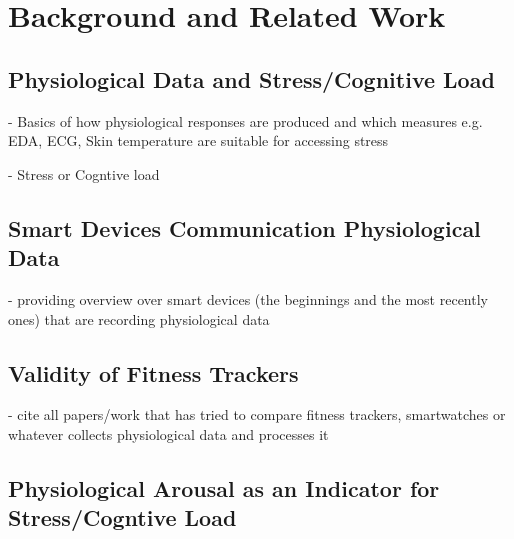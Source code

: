 \section{Background and Related Work}

\subsection{Physiological Data and Stress/Cognitive Load} 

- Basics of how physiological responses are produced and which measures e.g. EDA, ECG, Skin temperature are suitable for accessing stress 

- Stress or Cogntive load 


\subsection{Smart Devices Communication Physiological Data}

- providing overview over smart devices (the beginnings and the most recently ones) that are recording physiological data



\subsection{Validity of Fitness Trackers}

- cite all papers/work that has tried to compare fitness trackers, smartwatches or whatever collects physiological data and processes it  


\subsection{Physiological Arousal as an Indicator for Stress/Cogntive Load}





